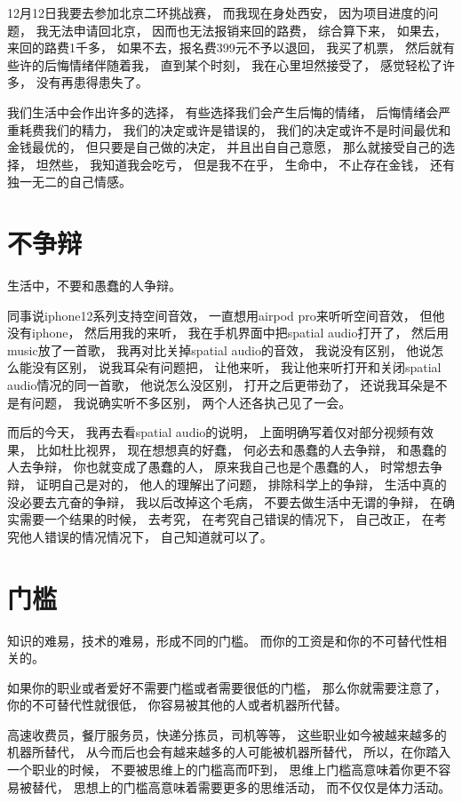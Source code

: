 12月12日我要去参加北京二环挑战赛，
而我现在身处西安，
因为项目进度的问题，
我无法申请回北京，
因而也无法报销来回的路费，
综合算下来，
如果去，来回的路费1千多，
如果不去，报名费399元不予以退回，
我买了机票，
然后就有些许的后悔情绪伴随着我，
直到某个时刻，
我在心里坦然接受了，
感觉轻松了许多，
没有再患得患失了。



我们生活中会作出许多的选择，
有些选择我们会产生后悔的情绪，
后悔情绪会严重耗费我们的精力，
我们的决定或许是错误的，
我们的决定或许不是时间最优和金钱最优的，
但只要是自己做的决定，
并且出自自己意愿，
那么就接受自己的选择，
坦然些，
我知道我会吃亏，
但是我不在乎，
生命中，
不止存在金钱，
还有独一无二的自己情感。







\section{不争辩}


生活中，不要和愚蠢的人争辩。


同事说iphone12系列支持空间音效，
一直想用airpod pro来听听空间音效，
但他没有iphone，
然后用我的来听，
我在手机界面中把spatial audio打开了，
然后用music放了一首歌，
我再对比关掉spatial audio的音效，
我说没有区别，
他说怎么能没有区别，
说我耳朵有问题把，
让他来听，
我让他来听打开和关闭spatial audio情况的同一首歌，
他说怎么没区别，
打开之后更带劲了，
还说我耳朵是不是有问题，
我说确实听不多区别，
两个人还各执己见了一会。

而后的今天，
我再去看spatial audio的说明，
上面明确写着仅对部分视频有效果，
比如杜比视界，
现在想想真的好蠢，
何必去和愚蠢的人去争辩，
和愚蠢的人去争辩，
你也就变成了愚蠢的人，
原来我自己也是个愚蠢的人，
时常想去争辩，
证明自己是对的，
他人的理解出了问题，
排除科学上的争辩，
生活中真的没必要去亢奋的争辩，
我以后改掉这个毛病，
不要去做生活中无谓的争辩，
在确实需要一个结果的时候，
去考究，
在考究自己错误的情况下，
自己改正，
在考究他人错误的情况情况下，
自己知道就可以了。



\section{门槛}


知识的难易，技术的难易，形成不同的门槛。
而你的工资是和你的不可替代性相关的。


如果你的职业或者爱好不需要门槛或者需要很低的门槛，
那么你就需要注意了，
你的不可替代性就很低，
你容易被其他的人或者机器所代替。

高速收费员，餐厅服务员，快递分拣员，司机等等，
这些职业如今被越来越多的机器所替代，
从今而后也会有越来越多的人可能被机器所替代，
所以，在你踏入一个职业的时候，
不要被思维上的门槛高而吓到，
思维上门槛高意味着你更不容易被替代，
思想上的门槛高意味着需要更多的思维活动，
而不仅仅是体力活动。







